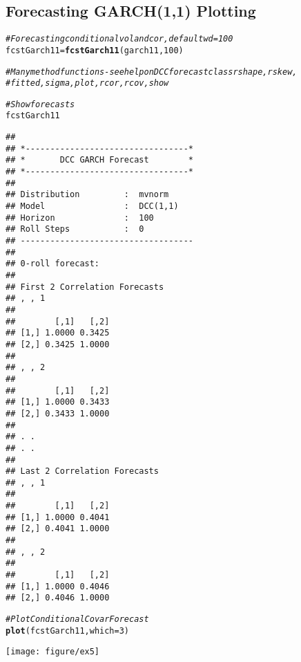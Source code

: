 \documentclass[a4paper]{article}\usepackage[]{graphicx}\usepackage[]{color}
\makeatletter
\def\maxwidth{ %
  \ifdim\Gin@nat@width>\linewidth
    \linewidth
  \else
    \Gin@nat@width
  \fi
}
\newcommand{\hlnum}[1]{\textcolor[rgb]{0.686,0.059,0.569}{#1}}%
\newcommand{\hlcom}[1]{\textcolor[rgb]{0.678,0.584,0.686}{\textit{#1}}}%
\newcommand{\hlstd}[1]{\textcolor[rgb]{0.345,0.345,0.345}{#1}}%
\newcommand{\hlkwb}[1]{\textcolor[rgb]{0.69,0.353,0.396}{#1}}%
\newcommand{\hlkwc}[1]{\textcolor[rgb]{0.333,0.667,0.333}{#1}}%
\newcommand{\hlkwd}[1]{\textcolor[rgb]{0.737,0.353,0.396}{\textbf{#1}}}%
\newenvironment{kframe}{%
 \def\at@end@of@kframe{}%
 \ifinner\ifhmode%
  \def\at@end@of@kframe{\end{minipage}}%
  \begin{minipage}{\columnwidth}%
 \fi\fi%
 \def\FrameCommand##1{\hskip\@totalleftmargin \hskip-\fboxsep
 \colorbox{shadecolor}{##1}\hskip-\fboxsep
     \hskip-\linewidth \hskip-\@totalleftmargin \hskip\columnwidth}%
 \MakeFramed {\advance\hsize-\width
   \@totalleftmargin\z@ \linewidth\hsize
   \@setminipage}}%
 {\par\unskip\endMakeFramed%
 \at@end@of@kframe}
\newenvironment{knitrout}{}{} %
\makeatother
\begin{document}
\subsection{Forecasting GARCH(1,1) Plotting}
\begin{knitrout}
\color{fgcolor}\begin{kframe}
\begin{alltt}
\hlcom{# Forecasting conditional vol and cor, default wd = 100}
\hlstd{fcstGarch11} \hlkwb{=} \hlkwd{fcstGarch11}\hlstd{(garch11,} \hlnum{100}\hlstd{)}

\hlcom{# Many method functions - see help on DCCforecast class rshape, rskew,}
\hlcom{# fitted, sigma, plot, rcor, rcov, show}

\hlcom{# Show forecasts}
\hlstd{fcstGarch11}
\end{alltt}
\begin{verbatim}
## 
## *---------------------------------*
## *       DCC GARCH Forecast        *
## *---------------------------------*
## 
## Distribution         :  mvnorm
## Model                :  DCC(1,1)
## Horizon              :  100
## Roll Steps           :  0
## -----------------------------------
## 
## 0-roll forecast: 
## 
## First 2 Correlation Forecasts
## , , 1
## 
##        [,1]   [,2]
## [1,] 1.0000 0.3425
## [2,] 0.3425 1.0000
## 
## , , 2
## 
##        [,1]   [,2]
## [1,] 1.0000 0.3433
## [2,] 0.3433 1.0000
## 
## . .
## . .
## 
## Last 2 Correlation Forecasts
## , , 1
## 
##        [,1]   [,2]
## [1,] 1.0000 0.4041
## [2,] 0.4041 1.0000
## 
## , , 2
## 
##        [,1]   [,2]
## [1,] 1.0000 0.4046
## [2,] 0.4046 1.0000
\end{verbatim}
\begin{alltt}
\hlcom{# Plot Conditional Covar Forecast}
\hlkwd{plot}\hlstd{(fcstGarch11,} \hlkwc{which} \hlstd{=} \hlnum{3}\hlstd{)}
\end{alltt}
\end{kframe}
\texttt{[image: figure/ex5]} 

\end{knitrout}
\end{document}
